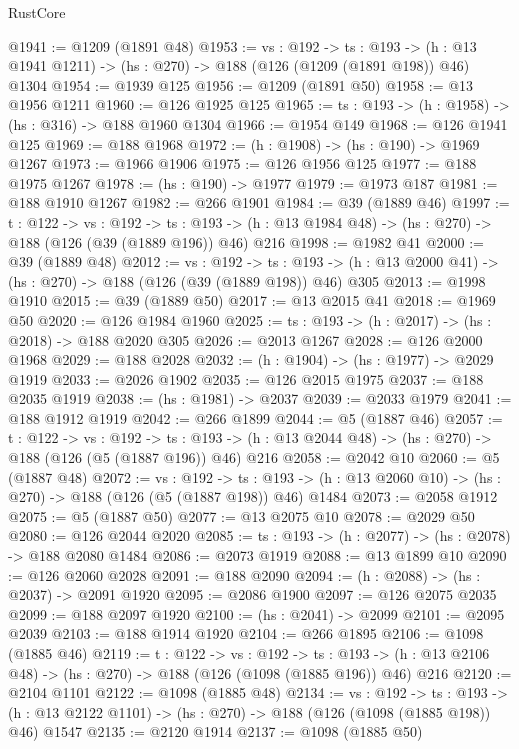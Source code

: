 \begin{lexlean}{RustCore}
\begin{coremodule}
@1941 := @1209 (@1891 @48)
@1953 := {vs : @192} ->
  {ts : @193} -> (h : @13 @1941 @1211) -> (hs : @270) -> @188 (@126 (@1209 (@1891 @198)) @46) @1304
@1954 := @1939 @125
@1956 := @1209 (@1891 @50)
@1958 := @13 @1956 @1211
@1960 := @126 @1925 @125
@1965 := {ts : @193} -> (h : @1958) -> (hs : @316) -> @188 @1960 @1304
@1966 := @1954 @149
@1968 := @126 @1941 @125
@1969 := @188 @1968
@1972 := (h : @1908) -> (hs : @190) -> @1969 @1267
@1973 := @1966 @1906
@1975 := @126 @1956 @125
@1977 := @188 @1975 @1267
@1978 := (hs : @190) -> @1977
@1979 := @1973 @187
@1981 := @188 @1910 @1267
@1982 := @266 @1901
@1984 := @39 (@1889 @46)
@1997 := {t : @122} ->
  {vs : @192} ->
  {ts : @193} -> (h : @13 @1984 @48) -> (hs : @270) -> @188 (@126 (@39 (@1889 @196)) @46) @216
@1998 := @1982 @41
@2000 := @39 (@1889 @48)
@2012 := {vs : @192} ->
  {ts : @193} -> (h : @13 @2000 @41) -> (hs : @270) -> @188 (@126 (@39 (@1889 @198)) @46) @305
@2013 := @1998 @1910
@2015 := @39 (@1889 @50)
@2017 := @13 @2015 @41
@2018 := @1969 @50
@2020 := @126 @1984 @1960
@2025 := {ts : @193} -> (h : @2017) -> (hs : @2018) -> @188 @2020 @305
@2026 := @2013 @1267
@2028 := @126 @2000 @1968
@2029 := @188 @2028
@2032 := (h : @1904) -> (hs : @1977) -> @2029 @1919
@2033 := @2026 @1902
@2035 := @126 @2015 @1975
@2037 := @188 @2035 @1919
@2038 := (hs : @1981) -> @2037
@2039 := @2033 @1979
@2041 := @188 @1912 @1919
@2042 := @266 @1899
@2044 := @5 (@1887 @46)
@2057 := {t : @122} ->
  {vs : @192} ->
  {ts : @193} -> (h : @13 @2044 @48) -> (hs : @270) -> @188 (@126 (@5 (@1887 @196)) @46) @216
@2058 := @2042 @10
@2060 := @5 (@1887 @48)
@2072 := {vs : @192} ->
  {ts : @193} -> (h : @13 @2060 @10) -> (hs : @270) -> @188 (@126 (@5 (@1887 @198)) @46) @1484
@2073 := @2058 @1912
@2075 := @5 (@1887 @50)
@2077 := @13 @2075 @10
@2078 := @2029 @50
@2080 := @126 @2044 @2020
@2085 := {ts : @193} -> (h : @2077) -> (hs : @2078) -> @188 @2080 @1484
@2086 := @2073 @1919
@2088 := @13 @1899 @10
@2090 := @126 @2060 @2028
@2091 := @188 @2090
@2094 := (h : @2088) -> (hs : @2037) -> @2091 @1920
@2095 := @2086 @1900
@2097 := @126 @2075 @2035
@2099 := @188 @2097 @1920
@2100 := (hs : @2041) -> @2099
@2101 := @2095 @2039
@2103 := @188 @1914 @1920
@2104 := @266 @1895
@2106 := @1098 (@1885 @46)
@2119 := {t : @122} ->
  {vs : @192} ->
  {ts : @193} -> (h : @13 @2106 @48) -> (hs : @270) -> @188 (@126 (@1098 (@1885 @196)) @46) @216
@2120 := @2104 @1101
@2122 := @1098 (@1885 @48)
@2134 := {vs : @192} ->
  {ts : @193} -> (h : @13 @2122 @1101) -> (hs : @270) -> @188 (@126 (@1098 (@1885 @198)) @46) @1547
@2135 := @2120 @1914
@2137 := @1098 (@1885 @50)

\end{coremodule}
\end{lexlean}
